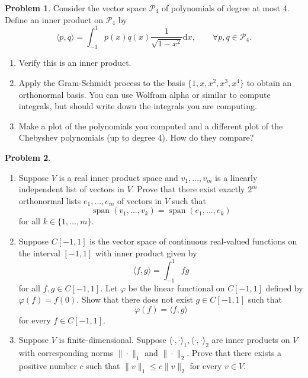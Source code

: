 \documentclass[12pt]{article}
\theoremstyle{definition}
\newtheorem{problem}{Problem}
\renewcommand{\d}{\mathrm{d}}
\begin{document}
\begin{problem}
    Consider the vector space $\mathcal{P}_4$ of polynomials of degree at most $4$. 
    Define an inner product on $\mathcal{P}_4$ by
    $$ 
    \langle p,q\rangle = \int_{-1}^{1} p(x) q(x) \frac{1}{\sqrt{1-x^2}}\d{x},
    \qquad \forall p,q\in\mathcal{P}_4.
    $$

    \begin{enumerate}
        \item Verify this is an inner product.
        \item Apply the Gram-Schmidt process to the basis $\{1,x,x^2,x^3,x^4\}$ to obtain an orthonormal basis.
        You can use Wolfram alpha or similar to compute integrals, but should write down the integrals you are computing.
        \item Make a plot of the polynomials you computed and a different plot of the Chebyshev polynomials (up to degree 4). How do they compare?
    \end{enumerate}
\end{problem}

\clearpage
\begin{problem}
    \begin{enumerate}
        \item Suppose $V$ is a real inner product space and $v_1, \ldots, v_m$ is a linearly independent list of vectors in $V$. Prove that there exist exactly $2^m$ orthonormal lists $e_1, \ldots, e_m$ of vectors in $V$ such that
        $$
        \operatorname{span}\left(v_1, \ldots, v_k\right)=\operatorname{span}\left(e_1, \ldots, e_k\right)
        $$
        for all $k \in\{1, \ldots, m\}$.
        \item Suppose $C[-1,1]$ is the vector space of continuous real-valued functions on the interval $[-1,1]$ with inner product given by
        $$
        \langle f, g\rangle=\int_{-1}^1 f g
        $$
        for all $f, g \in C[-1,1]$. Let $\varphi$ be the linear functional on $C[-1,1]$ defined by $\varphi(f)=f(0)$. Show that there does not exist $g \in C[-1,1]$ such that
        $$
        \varphi(f)=\langle f, g\rangle
        $$
        for every $f \in C[-1,1]$.
        \item Suppose $V$ is finite-dimensional. Suppose $\langle\cdot, \cdot\rangle_1,\langle\cdot, \cdot\rangle_2$ are inner products on $V$ with corresponding norms $\|\cdot\|_1$ and $\|\cdot\|_2$. Prove that there exists a positive number $c$ such that $\|v\|_1 \leq c\|v\|_2$ for every $v \in V$.
    \end{enumerate}
\end{problem}
\end{document}
